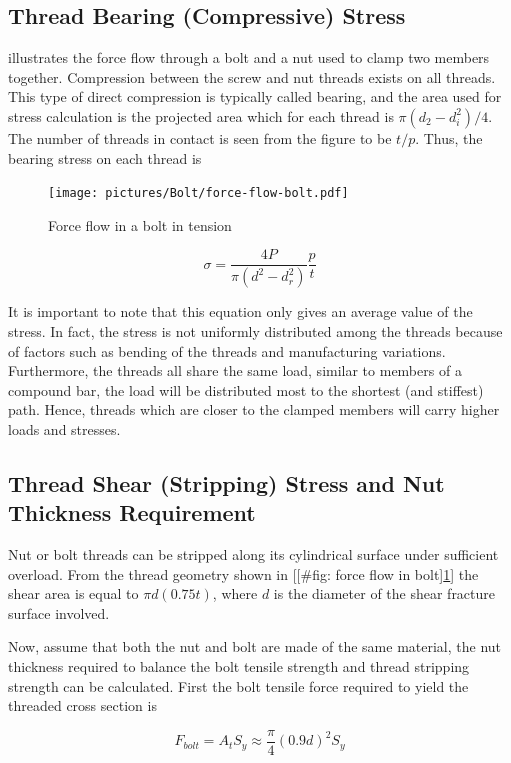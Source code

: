 \documentclass[a4paper,openany,12pt]{book}
\begin{document}
{{\subsection{Thread Bearing (Compressive) Stress}
\label{sec:org536e161}
illustrates the force flow through a bolt and a nut used to clamp two
members together. Compression between the screw and nut threads exists
on all threads. This type of direct compression is typically called
bearing, and the area used for stress calculation is the projected area
which for each thread is \(\pi(d_2 - d_i^2) / 4\). The number of threads
in contact is seen from the figure to be \(t/p\). Thus, the bearing stress
on each thread is


\begin{figure}[htbp]
\centering
\texttt{[image: pictures/Bolt/force-flow-bolt.pdf]}
\caption{\label{fig:orgbaef6ed}
Force flow in a bolt in tension \cite{juvinall2006fundamentals}}
\end{figure}

$$\sigma  = \frac{4P}{\pi (d^2 - d_r^2)}\frac{p}{t}$$

It is important to note that this equation only gives an average value
of the stress. In fact, the stress is not uniformly distributed among
the threads because of factors such as bending of the threads and
manufacturing variations. Furthermore, the threads all share the same
load, similar to members of a compound bar, the load will be distributed
most to the shortest (and stiffest) path. Hence, threads which are
closer to the clamped members will carry higher loads and stresses.

\subsection{Thread Shear (Stripping) Stress and Nut Thickness Requirement}
\label{sec:org7ce36ce}
Nut or bolt threads can be stripped along its cylindrical surface under
sufficient overload. From the thread geometry shown in
[[\#fig: force flow in bolt]\ref{fig:orgbaef6ed}] the shear area
is equal to \(\pi d(0.75t)\), where \(d\) is the diameter of the shear
fracture surface involved.

Now, assume that both the nut and bolt are made of the same material,
the nut thickness required to balance the bolt tensile strength and
thread stripping strength can be calculated. First the bolt tensile
force required to yield the threaded cross section is

$$F_{bolt} = A_tS_y \approx \frac{\pi}{4}(0.9d)^2S_y$$

}}
\end{document}
